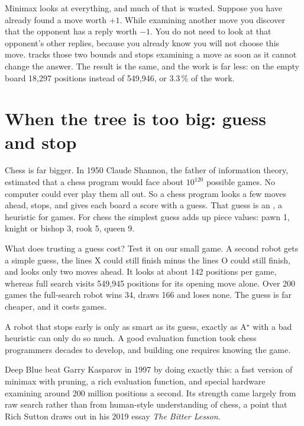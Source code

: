 Minimax looks at everything, and much of that is wasted. Suppose you have already found a move worth $+1$. While examining another move you discover that the opponent has a reply worth $-1$. You do not need to look at that opponent's other replies, because you already know you will not choose this move.  tracks those two bounds and stops examining a move as soon as it cannot change the answer. The result is the same, and the work is far less: on the empty board 18,297 positions instead of 549,946, or 3.3\,\% of the work.

\section{When the tree is too big: guess and stop}

Chess is far bigger. In 1950 Claude Shannon, the father of information theory, estimated that a chess program would face about $10^{120}$ possible games. No computer could ever play them all out. So a chess program looks a few moves ahead, stops, and gives each board a score with a guess. That guess is an , a heuristic for games. For chess the simplest guess adds up piece values: pawn 1, knight or bishop 3, rook 5, queen 9.

What does trusting a guess cost? Test it on our small game. A second robot gets a simple guess, the lines X could still finish minus the lines O could still finish, and looks only two moves ahead. It looks at about 142 positions per game, whereas full search visits 549,945 positions for its opening move alone. Over 200 games the full-search robot wins 34, draws 166 and loses none. The guess is far cheaper, and it costs games.

\begin{pitfall}
A robot that stops early is only as smart as its guess, exactly as A$^\star$ with a bad heuristic can only do so much. A good evaluation function took chess programmers decades to develop, and building one requires knowing the game.
\end{pitfall}

\begin{libnote}
Deep Blue beat Garry Kasparov in 1997 by doing exactly this: a fast version of minimax with pruning, a rich evaluation function, and special hardware examining around 200 million positions a second. Its strength came largely from raw search rather than from human-style understanding of chess, a point that Rich Sutton draws out in his 2019 essay \emph{The Bitter Lesson}.
\end{libnote}

